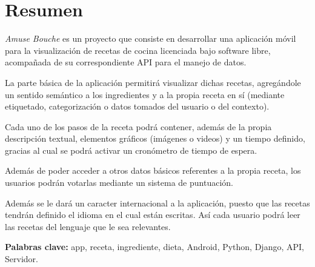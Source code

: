 \section*{Resumen}

\textit{Amuse Bouche} es un proyecto que consiste en desarrollar una aplicación
móvil para la visualización de recetas de cocina licenciada bajo software libre,
acompañada de su correspondiente API para el manejo de datos.

La parte básica de la aplicación permitirá visualizar dichas recetas, agregándole
un sentido semántico a los ingredientes y a la propia receta en sí (mediante
etiquetado, categorización o datos tomados del usuario o del contexto).

Cada uno de los pasos de la receta podrá contener, además de la propia descripción
textual, elementos gráficos (imágenes o videos) y un tiempo definido, gracias al
cual se podrá activar un cronómetro de tiempo de espera.

Además de poder acceder a otros datos básicos referentes a la propia receta, los
usuarios podrán votarlas mediante un sistema de puntuación.

Además se le dará un caracter internacional a la aplicación, puesto que las
recetas tendrán definido el idioma en el cual están escritas. Así cada usuario
podrá leer las recetas del lenguaje que le sea relevantes.

\textbf{Palabras clave:} app, receta, ingrediente, dieta, Android, Python,
Django, API, Servidor.
